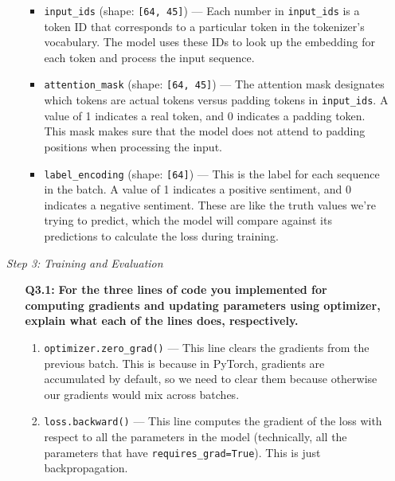 \documentclass{article}
\begin{document}
\begin{itemize}
\begin{itemize}
        \begin{itemize}
            \item \texttt{input\_ids} (shape: \texttt{[64, 45]}) --- Each number
            in \texttt{input\_ids} is a token ID that corresponds to a
            particular token in the tokenizer's vocabulary. The model uses these
            IDs to look up the embedding for each token and process the input
            sequence.
            \item \texttt{attention\_mask} (shape: \texttt{[64, 45]}) --- The
            attention mask designates which tokens are actual tokens versus
            padding tokens in \texttt{input\_ids}. A value of 1 indicates a real
            token, and 0 indicates a padding token. This mask makes sure that
            the model does not attend to padding positions when processing the
            input.
            \item \texttt{label\_encoding} (shape: \texttt{[64]}) --- This is
            the label for each sequence in the batch. A value of 1 indicates a
            positive sentiment, and 0 indicates a negative sentiment. These are
            like the truth values we're trying to predict, which the model will
            compare against its predictions to calculate the loss during
            training.
        \end{itemize}

    \end{itemize}
    
    \item[\textit{Step 3:}] \textit{Training and Evaluation}

    \begin{itemize}
        \item[\textbf{Q3.1:}] \textbf{For the three lines of code you
        implemented for computing gradients and updating parameters using
        optimizer, explain what each of the lines does, respectively.}

        \begin{enumerate}
            \item \texttt{optimizer.zero\_grad()} --- This line clears the
            gradients from the previous batch. This is because in PyTorch,
            gradients are accumulated by default, so we need to clear them
            because otherwise our gradients would mix across batches.

            \item \texttt{loss.backward()} --- This line computes the gradient
            of the loss with respect to all the parameters in the model
            (technically, all the parameters that have
            \texttt{requires\_grad=True}). This is just backpropagation.


\end{enumerate}
\end{itemize}
\end{itemize}
\end{document}
